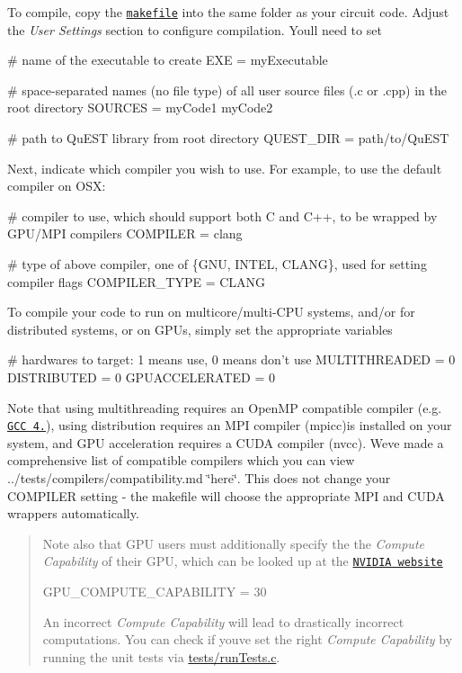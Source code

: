 To compile, copy the \href{../makefile}{\tt makefile} into the same folder as your circuit code. Adjust the {\itshape User Settings} section to configure compilation. You\textquotesingle{}ll need to set 
\begin{DoxyCode}
# name of the executable to create
EXE = myExecutable

# space-separated names (no file type) of all user source files (.c or .cpp) in the root directory
SOURCES = myCode1 myCode2

# path to QuEST library from root directory
QUEST\_DIR = path/to/QuEST
\end{DoxyCode}


Next, indicate which compiler you wish to use. For example, to use the default compiler on O\+SX\+: 
\begin{DoxyCode}
# compiler to use, which should support both C and C++, to be wrapped by GPU/MPI compilers
COMPILER = clang

# type of above compiler, one of \{GNU, INTEL, CLANG\}, used for setting compiler flags
COMPILER\_TYPE = CLANG
\end{DoxyCode}


To compile your code to run on multicore/multi-\/\+C\+PU systems, and/or for distributed systems, or on G\+P\+Us, simply set the appropriate variables 
\begin{DoxyCode}
# hardwares to target: 1 means use, 0 means don't use
MULTITHREADED = 0
DISTRIBUTED = 0
GPUACCELERATED = 0
\end{DoxyCode}
 Note that using multithreading requires an Open\+MP compatible compiler (e.\+g. \href{https://gcc.gnu.org/gcc-4.9/changes.html}{\tt G\+CC 4.}), using distribution requires an M\+PI compiler ({\ttfamily mpicc})is installed on your system, and G\+PU acceleration requires a C\+U\+DA compiler ({\ttfamily nvcc}). We\textquotesingle{}ve made a comprehensive list of compatible compilers which you can view ../tests/compilers/compatibility.md \char`\"{}here\char`\"{}. This does not change your {\ttfamily C\+O\+M\+P\+I\+L\+ER} setting -\/ the makefile will choose the appropriate M\+PI and C\+U\+DA wrappers automatically.

\begin{quote}
Note also that G\+PU users must additionally specify the the {\itshape Compute Capability} of their G\+PU, which can be looked up at the \href{https://developer.nvidia.com/cuda-gpus}{\tt N\+V\+I\+D\+IA website} 
\begin{DoxyCode}
GPU\_COMPUTE\_CAPABILITY = 30
\end{DoxyCode}
 An incorrect {\itshape Compute Capability} will lead to drastically incorrect computations. You can check if you\textquotesingle{}ve set the right {\itshape Compute Capability} by running the unit tests via {\ttfamily \mbox{\hyperlink{runTests_8c}{tests/run\+Tests.\+c}}}. \end{quote}


